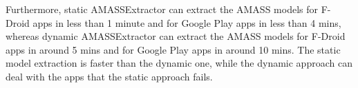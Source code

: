 Furthermore, static {\sf AMASSExtractor} can extract the {\sf AMASS} models for F-Droid apps in less than 1 minute and for Google Play apps in less than 4 mins, whereas %
dynamic {\sf AMASSExtractor} can extract the {\sf AMASS} models for F-Droid apps in around 5 mins and for Google Play apps in around 10 mins. The static model extraction is faster than the dynamic one, while the dynamic approach can deal with the apps that the static approach fails.



